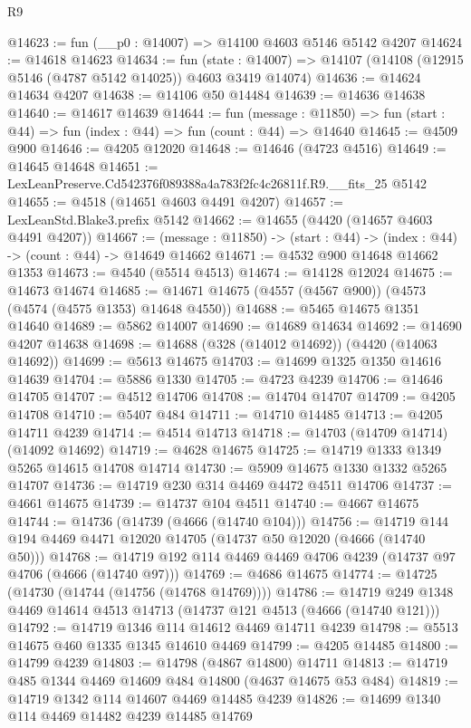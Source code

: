 \begin{lexlean}{R9}
\begin{coremodule}
@14623 := fun (__p0 : @14007) => @14100 @4603 @5146 @5142 @4207
@14624 := @14618 @14623
@14634 := fun (state : @14007) =>
  @14107 (@14108 (@12915 @5146 (@4787 @5142 @14025)) @4603 @3419 @14074)
@14636 := @14624 @14634 @4207
@14638 := @14106 @50 @14484
@14639 := @14636 @14638
@14640 := @14617 @14639
@14644 := fun (message : @11850) =>
  fun (start : @44) => fun (index : @44) => fun (count : @44) => @14640
@14645 := @4509 @900
@14646 := @4205 @12020
@14648 := @14646 (@4723 @4516)
@14649 := @14645 @14648
@14651 := LexLeanPreserve.Cd542376f089388a4a783f2fc4c26811f.R9.__fits_25 @5142
@14655 := @4518 (@14651 @4603 @4491 @4207)
@14657 := LexLeanStd.Blake3.prefix @5142
@14662 := @14655 (@4420 (@14657 @4603 @4491 @4207))
@14667 := (message : @11850) -> (start : @44) -> (index : @44) -> (count : @44) -> @14649 @14662
@14671 := @4532 @900 @14648 @14662 @1353
@14673 := @4540 (@5514 @4513)
@14674 := @14128 @12024
@14675 := @14673 @14674
@14685 := @14671 @14675 (@4557 (@4567 @900)) (@4573 (@4574 (@4575 @1353) @14648 @4550))
@14688 := @5465 @14675 @1351 @14640
@14689 := @5862 @14007
@14690 := @14689 @14634
@14692 := @14690 @4207 @14638
@14698 := @14688 (@328 (@14012 @14692)) (@4420 (@14063 @14692))
@14699 := @5613 @14675
@14703 := @14699 @1325 @1350 @14616 @14639
@14704 := @5886 @1330
@14705 := @4723 @4239
@14706 := @14646 @14705
@14707 := @4512 @14706
@14708 := @14704 @14707
@14709 := @4205 @14708
@14710 := @5407 @484
@14711 := @14710 @14485
@14713 := @4205 @14711 @4239
@14714 := @4514 @14713
@14718 := @14703 (@14709 @14714) (@14092 @14692)
@14719 := @4628 @14675
@14725 := @14719 @1333 @1349 @5265 @14615 @14708 @14714
@14730 := @5909 @14675 @1330 @1332 @5265 @14707
@14736 := @14719 @230 @314 @4469 @4472 @4511 @14706
@14737 := @4661 @14675
@14739 := @14737 @104 @4511
@14740 := @4667 @14675
@14744 := @14736 (@14739 (@4666 (@14740 @104)))
@14756 := @14719 @144 @194 @4469 @4471 @12020 @14705 (@14737 @50 @12020 (@4666 (@14740 @50)))
@14768 := @14719 @192 @114 @4469 @4469 @4706 @4239 (@14737 @97 @4706 (@4666 (@14740 @97)))
@14769 := @4686 @14675
@14774 := @14725 (@14730 (@14744 (@14756 (@14768 @14769))))
@14786 := @14719 @249 @1348 @4469 @14614 @4513 @14713 (@14737 @121 @4513 (@4666 (@14740 @121)))
@14792 := @14719 @1346 @114 @14612 @4469 @14711 @4239
@14798 := @5513 @14675 @460 @1335 @1345 @14610 @4469
@14799 := @4205 @14485
@14800 := @14799 @4239
@14803 := @14798 (@4867 @14800) @14711
@14813 := @14719 @485 @1344 @4469 @14609 @484 @14800 (@4637 @14675 @53 @484)
@14819 := @14719 @1342 @114 @14607 @4469 @14485 @4239
@14826 := @14699 @1340 @114 @4469 @14482 @4239 @14485 @14769

\end{coremodule}
\end{lexlean}
